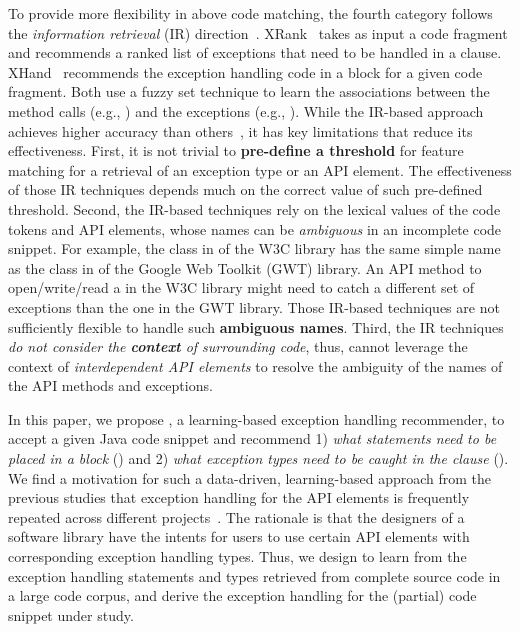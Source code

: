 To provide more flexibility in above code matching, the fourth
category follows the {\em information retrieval} (IR)
direction~\cite{xrank-fse20}. XRank~\cite{xrank-fse20} takes as input
a code fragment and recommends a ranked list of exceptions that need
to be handled in a  clause. XHand~\cite{xrank-fse20}
recommends the exception handling code in a  block for a
given code fragment. Both use a fuzzy set technique to learn the
associations between the method calls (e.g.,
) and the exceptions (e.g.,
). While the IR-based approach achieves higher
accuracy than others~\cite{xrank-fse20}, it has key limitations that
reduce its effectiveness. First, it is not trivial to {\bf pre-define
  a threshold} for feature matching for a retrieval of an exception
type or an API element. The effectiveness of those IR techniques
depends much on the correct value of such pre-defined
threshold. Second, the IR-based techniques rely on the lexical values
of the code tokens and API elements, whose names can be {\em
  ambiguous} in an incomplete code snippet. For example, the
 class in  of the W3C library has
the same simple name as the  class in
 of the Google Web
Toolkit (GWT) library. An API method to open/write/read a
 in the W3C library might need to catch a different set
of exceptions than the one in the GWT library. Those IR-based
techniques are not sufficiently flexible to handle such {\bf ambiguous
  names}. Third, the IR techniques {\em do not consider the {\bf
    context} of surrounding code}, thus, cannot leverage the context
of {\em interdependent API elements} to resolve the ambiguity of the
names of the API methods and exceptions.

In this paper, we propose {\tool}, a learning-based exception handling
recommender, to accept a given Java code snippet and recommend
1) {\em what statements need to be placed in a  block}
({\xstate}) and 2) {\em what exception types need to be
  caught in the  clause} ({\xtype}).  We find a motivation
for such a data-driven, learning-based approach from the previous
studies that exception handling for the API elements is frequently
repeated across different
projects~\cite{chanchal-scam14,zhong-jss18}. The rationale is that the
designers of a software library have the intents for users to use
certain API elements with corresponding exception handling types.
Thus, we design {\tool} to learn from the exception handling
statements and types retrieved from complete source code in a large
code corpus, and derive the exception handling for the (partial) code
snippet under study.

